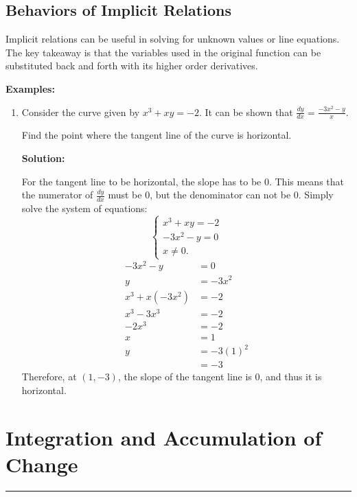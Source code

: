 \documentclass[12pt]{article}
\newcommand{\fline}{\par\noindent\rule{\textwidth}{0.1pt}} %
\begin{document}
\subsection{Behaviors of Implicit Relations} %
Implicit relations can be useful in solving for unknown values or line equations. The key takeaway is that the variables used in the original function can be substituted back and forth with its higher order derivatives.

\noindent \textbf{Examples:}
\begin{enumerate}
    \item Consider the curve given by $x^3 + xy = -2$. It can be shown that $\frac{dy}{dx} = \frac{-3x^2 - y}{x}$.

          Find the point where the tangent line of the curve is horizontal.
          \bigskip

          \textbf{Solution:}

          For the tangent line to be horizontal, the slope has to be $0$. This means that the numerator of $\frac{dy}{dx}$ must be $0$, but the denominator can not be $0$. Simply solve the system of equations:
          \[ \begin{cases}
                  x^3 + xy = -2 \\
                  -3x^2 - y = 0 \\
                  x \ne 0.
              \end{cases} \]
          \begin{align*}
              -3x^2 - y      & = 0       \\
              y              & = -3x^2   \\[6pt]
              x^3 + x(-3x^2) & = -2      \\
              x^3 - 3x^3     & = -2      \\
              -2x^3          & = -2      \\
              x              & = 1       \\[6pt]
              y              & = -3(1)^2 \\
                             & = -3
          \end{align*}
          Therefore, at $(1, -3)$, the slope of the tangent line is $0$, and thus it is horizontal.
\end{enumerate}

\section{Integration and Accumulation of Change}
\fline
\end{document}
